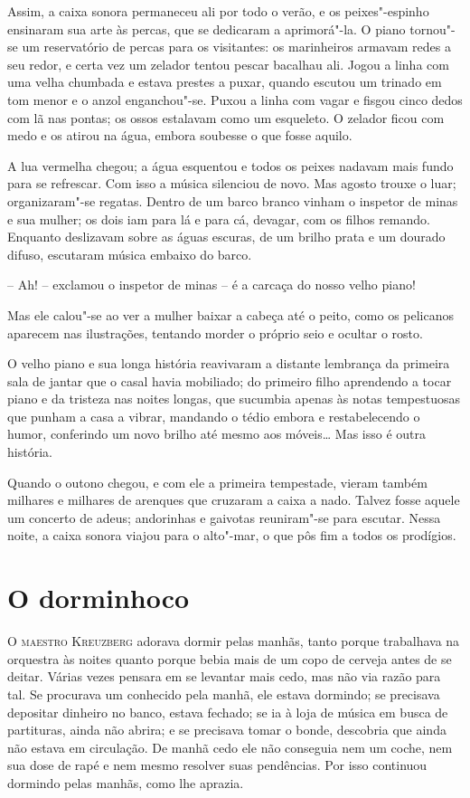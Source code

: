 Assim, a caixa sonora permaneceu ali por todo o verão, e os
peixes"-espinho ensinaram sua arte às percas, que se dedicaram a
aprimorá"-la. O piano tornou"-se um reservatório de percas para os
visitantes: os marinheiros armavam redes a seu redor, e certa vez um
zelador tentou pescar bacalhau ali. Jogou a linha com uma velha
chumbada e estava prestes a puxar, quando escutou um trinado em tom
menor e o anzol enganchou"-se. Puxou a linha com vagar e fisgou cinco
dedos com lã nas pontas; os ossos estalavam como um esqueleto. O
zelador ficou com medo e os atirou na água, embora soubesse o
que fosse aquilo.

A lua vermelha chegou; a água esquentou e todos os peixes nadavam mais
fundo para se refrescar. Com isso a música silenciou de novo. Mas
agosto trouxe o luar; organizaram"-se regatas. Dentro de um barco
branco vinham o inspetor de minas e sua mulher; os dois iam para lá e para cá,
devagar, com os filhos remando. Enquanto deslizavam sobre as  águas
escuras, de um brilho prata e um dourado difuso, escutaram música
embaixo do barco.

-- Ah! -- exclamou o inspetor de minas -- é a carcaça do nosso velho piano!

Mas ele calou"-se ao ver a mulher baixar a cabeça até o peito, como os
pelicanos aparecem nas ilustrações, tentando morder o próprio seio e
ocultar o rosto.

O velho piano e sua longa história reavivaram a distante lembrança da
primeira sala de jantar que o casal havia mobiliado; do primeiro filho
aprendendo a tocar piano e da tristeza nas noites longas, que sucumbia
apenas às notas tempestuosas que punham a casa a vibrar, mandando o
tédio embora e restabelecendo o humor, conferindo um novo brilho até
mesmo aos móveis\ldots{} Mas isso é outra história.
\asterisc

Quando o outono chegou, e com ele a primeira tempestade, vieram também
milhares e milhares de arenques que cruzaram a caixa a nado. Talvez
fosse aquele um concerto de adeus; andorinhas e gaivotas reuniram"-se
para escutar. Nessa noite, a caixa sonora viajou para o alto"-mar, o
que pôs fim a todos os prodígios.

\chapter{O dorminhoco}

\textsc{O maestro Kreuzberg} adorava dormir pelas manhãs, tanto porque trabalhava
na orquestra às noites quanto porque bebia mais de um copo de cerveja
antes de se deitar. Várias vezes pensara em se levantar mais cedo, mas
não via razão para tal. Se procurava um conhecido pela manhã, ele
estava dormindo; se precisava depositar dinheiro no banco, estava
fechado; se ia à loja de música em busca de partituras, ainda não
abrira; e se precisava tomar o bonde, descobria que ainda não estava em
circulação. De manhã cedo ele não conseguia nem um coche, nem sua dose
de rapé e nem mesmo resolver suas pendências. Por isso continuou dormindo
pelas manhãs, como lhe aprazia.

